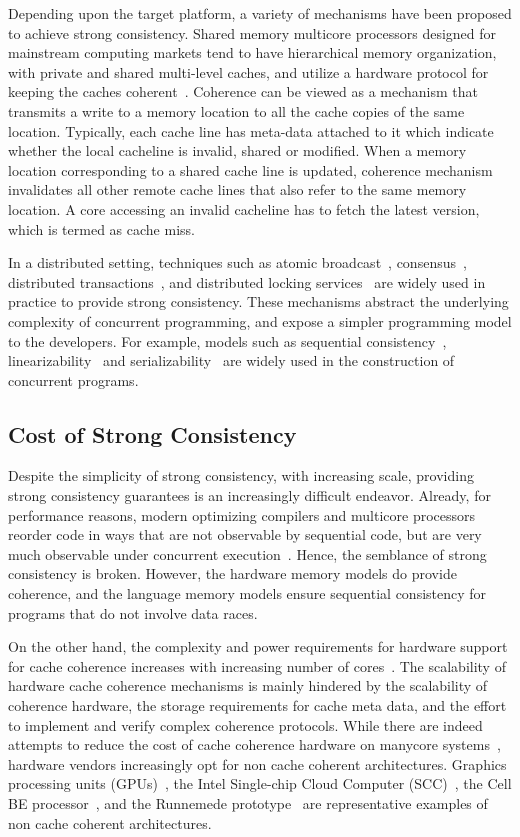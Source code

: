 Depending upon the target platform, a variety of mechanisms have been proposed
to achieve strong consistency. Shared memory multicore processors designed for
mainstream computing markets tend to have hierarchical memory organization,
with private and shared multi-level caches, and utilize a hardware protocol for
keeping the caches coherent~\cite{Martin2012}. Coherence can be viewed as a
mechanism that transmits a write to a memory location to all the cache copies
of the same location. Typically, each cache line has meta-data attached to it
which indicate whether the local cacheline is invalid, shared or modified. When
a memory location corresponding to a shared cache line is updated, coherence
mechanism invalidates all other remote cache lines that also refer to the same
memory location. A core accessing an invalid cacheline has to fetch the latest
version, which is termed as cache miss.

In a distributed setting, techniques such as atomic
broadcast~\cite{Defago2004}, consensus~\cite{Lamport98}, distributed
transactions~\cite{Traiger1982}, and distributed locking
services~\cite{Burrows2006} are widely used in practice to provide strong
consistency. These mechanisms abstract the underlying complexity of concurrent
programming, and expose a simpler programming model to the developers. For
example, models such as sequential consistency~\cite{Lam79},
linearizability~\cite{Herlihy1990} and serializability~\cite{Serializability}
are widely used in the construction of concurrent programs.

\subsection{Cost of Strong Consistency}

Despite the simplicity of strong consistency, with increasing scale, providing
strong consistency guarantees is an increasingly difficult endeavor. Already,
for performance reasons, modern optimizing compilers and multicore processors
reorder code in ways that are not observable by sequential code, but are very
much observable under concurrent
execution~\cite{Demange2013,Sewell2010,Sarkar2011,Batty2011}. Hence, the
semblance of strong consistency is broken. However, the hardware memory models
do provide coherence, and the language memory models ensure sequential
consistency for programs that do not involve data races.

On the other hand, the complexity and power requirements for hardware support
for cache coherence increases with increasing number of
cores~\cite{Kavadias2010}. The scalability of hardware cache coherence
mechanisms is mainly hindered by the scalability of coherence hardware, the
storage requirements for cache meta data, and the effort to implement and verify
complex coherence protocols. While there are indeed attempts to reduce the cost
of cache coherence hardware on manycore systems~\cite{Martin2012}, hardware
vendors increasingly opt for non cache coherent architectures. Graphics
processing units (GPUs)~\cite{Luebke2004}, the Intel Single-chip Cloud Computer
(SCC)~\cite{Mattson2010}, the Cell BE processor~\cite{Kahle2005}, and the
Runnemede prototype~\cite{Carter2013} are representative examples of non cache
coherent architectures.


